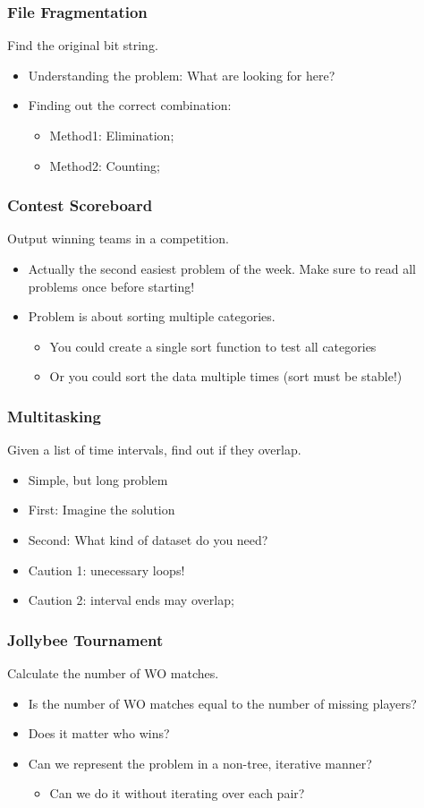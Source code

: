 \documentclass{beamer}
\begin{document}
\begin{frame}
  \frametitle{File Fragmentation}
  Find the original bit string.
  \begin{itemize}
  \item Understanding the problem: What are looking for here?
  \item Finding out the correct combination:
    \begin{itemize}
    \item Method1: Elimination;
    \item Method2: Counting;
    \end{itemize}
  \end{itemize}
\end{frame}

\begin{frame}
  \frametitle{Contest Scoreboard}
  Output winning teams in a competition.
  \begin{itemize}
  \item Actually the second easiest problem of the week. Make sure to
    read all problems once before starting!
  \item Problem is about sorting multiple categories.
    \begin{itemize}
    \item You could create a single sort function to test all categories
    \item Or you could sort the data multiple times (sort must be stable!)
    \end{itemize}
  \end{itemize}
\end{frame}

\begin{frame}
  \frametitle{Multitasking}
  Given a list of time intervals, find out if they overlap.
  \begin{itemize}
  \item Simple, but long problem
  \item First: Imagine the solution
  \item Second: What kind of dataset do you need?
  \item Caution 1: unecessary loops!
  \item Caution 2: interval ends \alert{may} overlap;
  \end{itemize}
\end{frame}

\begin{frame}
  \frametitle{Jollybee Tournament}
  Calculate the number of WO matches.
  \begin{itemize}
  \item Is the number of WO matches equal to the number of missing players?
  \item Does it matter who wins?
  \item Can we represent the problem in a non-tree, iterative manner?
    \begin{itemize}
    \item Can we do it without iterating over each pair?
    \end{itemize}
  \end{itemize}
\end{frame}
\end{document}
